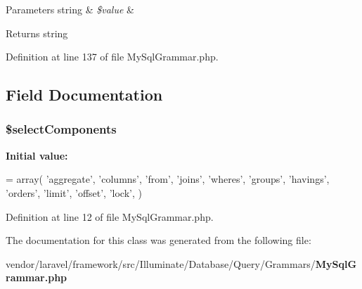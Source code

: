 \begin{DoxyParams}[1]{Parameters}
string & {\em \$value} & \\
\hline
\end{DoxyParams}
\begin{DoxyReturn}{Returns}
string 
\end{DoxyReturn}


Definition at line 137 of file My\+Sql\+Grammar.\+php.



\subsection{Field Documentation}
\subsubsection[{\$select\+Components}]{\setlength{\rightskip}{0pt plus 5cm}\$select\+Components\hspace{0.3cm}{\ttfamily [protected]}}\label{class_illuminate_1_1_database_1_1_query_1_1_grammars_1_1_my_sql_grammar_a39380226e96f850f8c6055eee9b47282}
{\bfseries Initial value\+:}
\begin{DoxyCode}
= array(
        \textcolor{stringliteral}{'aggregate'},
        \textcolor{stringliteral}{'columns'},
        \textcolor{stringliteral}{'from'},
        \textcolor{stringliteral}{'joins'},
        \textcolor{stringliteral}{'wheres'},
        \textcolor{stringliteral}{'groups'},
        \textcolor{stringliteral}{'havings'},
        \textcolor{stringliteral}{'orders'},
        \textcolor{stringliteral}{'limit'},
        \textcolor{stringliteral}{'offset'},
        \textcolor{stringliteral}{'lock'},
    )
\end{DoxyCode}


Definition at line 12 of file My\+Sql\+Grammar.\+php.



The documentation for this class was generated from the following file\+:\begin{DoxyCompactItemize}
\item 
vendor/laravel/framework/src/\+Illuminate/\+Database/\+Query/\+Grammars/{\bf My\+Sql\+Grammar.\+php}\end{DoxyCompactItemize}
